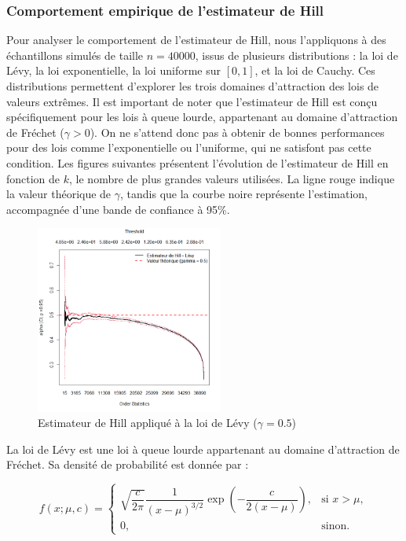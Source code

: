 \documentclass{article}
\theoremstyle{plain}
\theoremstyle{definition}
\theoremstyle{plain}
\begin{document}
\subsubsection{Comportement empirique de l’estimateur de Hill}
\noindent Pour analyser le comportement de l’estimateur de Hill, nous l’appliquons à des échantillons simulés de taille \(n = 40000\), issus de plusieurs distributions : la loi de Lévy, la loi exponentielle, la loi uniforme sur \([0,1]\), et la loi de Cauchy. Ces distributions permettent d’explorer les trois domaines d’attraction des lois de valeurs extrêmes.
Il est important de noter que l’estimateur de Hill est conçu spécifiquement pour les lois à queue lourde, appartenant au domaine d’attraction de Fréchet (\(\gamma > 0\)). On ne s’attend donc pas à obtenir de bonnes performances pour des lois comme l’exponentielle ou l’uniforme, qui ne satisfont pas cette condition.
Les figures suivantes présentent l’évolution de l’estimateur de Hill en fonction de \(k\), le nombre de plus grandes valeurs utilisées. La ligne rouge indique la valeur théorique de \(\gamma\), tandis que la courbe noire représente l’estimation, accompagnée d’une bande de confiance à 95\%.
\begin{figure}[H]
    \centering
    \includegraphics[width=0.55\textwidth]{./Evolution des estimateurs/hill/estimateur_hill_levy.png}
    \caption{Estimateur de Hill appliqué à la loi de Lévy ($\gamma = 0.5$)}
\end{figure}
\noindent La loi de Lévy est une loi à queue lourde appartenant au domaine d’attraction de Fréchet. Sa densité de probabilité est donnée par :

\[
f(x; \mu, c) =
\begin{cases}
\sqrt{\dfrac{c}{2\pi}} \dfrac{1}{(x - \mu)^{3/2}} \exp\left(-\dfrac{c}{2(x - \mu)}\right), & \text{si } x > \mu, \\
0, & \text{sinon.}
\end{cases}
\]
\end{document}
